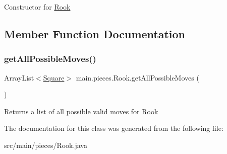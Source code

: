 Constructor for \hyperlink{classmain_1_1pieces_1_1_rook}{Rook} 

\subsection{Member Function Documentation}
\mbox{\label{classmain_1_1pieces_1_1_rook_a5f7c1bc6f8aba1f915d2274601232218}} 
\subsubsection{\texorpdfstring{get\+All\+Possible\+Moves()}{getAllPossibleMoves()}}
{\footnotesize\ttfamily Array\+List$<$\hyperlink{classmain_1_1_square}{Square}$>$ main.\+pieces.\+Rook.\+get\+All\+Possible\+Moves (\begin{DoxyParamCaption}{ }\end{DoxyParamCaption})\hspace{0.3cm}{\ttfamily [inline]}}

Returns a list of all possible valid moves for \hyperlink{classmain_1_1pieces_1_1_rook}{Rook} 

The documentation for this class was generated from the following file\+:\begin{DoxyCompactItemize}
\item 
src/main/pieces/Rook.\+java\end{DoxyCompactItemize}
